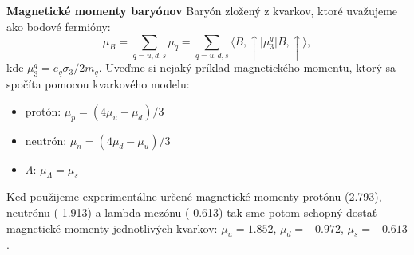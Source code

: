 \documentclass[../../main.tex]{subfiles}
\begin{document}
\textbf{Magnetické momenty baryónov}\newline
Baryón zložený z kvarkov, ktoré uvažujeme ako bodové fermióny: 
\begin{equation}
\mu_B = \sum_{q=u,d,s} \mu_q = \sum_{q=u,d,s} \langle B,\uparrow \vert \mu_3^q  \vert B,\uparrow \rangle,
\end{equation}
kde $\mu_3^q= e_q\sigma_3/2m_q $. Uveďme si nejaký príklad magnetického momentu, ktorý sa spočíta pomocou kvarkového modelu:
\begin{itemize}
\item protón: $\mu_p = (4\mu_u - \mu_d)/3$
\item neutrón: $\mu_n = (4\mu_d - \mu_u)/3$
\item $\Lambda$: $\mu_{\Lambda} = \mu_s$
\end{itemize}
Keď použijeme experimentálne určené magnetické momenty protónu (2.793), neutrónu (-1.913) a lambda mezónu (-0.613) tak sme potom schopný dostať magnetické momenty jednotlivých kvarkov: $\mu_u = 1.852$, $\mu_d = -0.972$, $\mu_s = -0.613$.\newline
\end{document}
